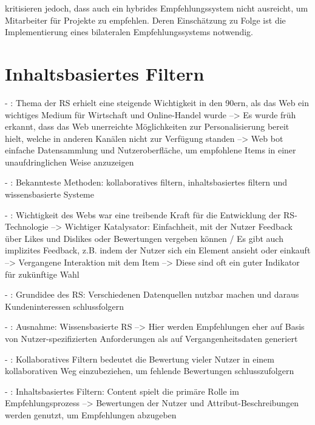 \textcite[S. 1]{malinowski:2008} kritisieren jedoch, dass auch ein hybrides Empfehlungssystem nicht ausreicht, um Mitarbeiter für Projekte zu empfehlen. Deren Einschätzung zu Folge ist die Implementierung eines bilateralen Empfehlungssystems notwendig.

\section{Inhaltsbasiertes Filtern}
\label{ch:empfehlungssysteme:cfundcb}

\newpage
- \cite[S. xvii]{recommenderSystems:2016}: Thema der RS erhielt eine steigende Wichtigkeit in den 90ern, als das Web ein wichtiges Medium für Wirtschaft und Online-Handel wurde --> Es wurde früh erkannt, dass das Web unerreichte Möglichkeiten zur Personalisierung bereit hielt, welche in anderen Kanälen nicht zur Verfügung standen --> Web bot einfache Datensammlung und Nutzeroberfläche, um empfohlene Items in einer unaufdringlichen Weise anzuzeigen

- \cite[S. xvii]{recommenderSystems:2016}: Bekannteste Methoden: kollaboratives filtern, inhaltsbasiertes filtern und wissensbasierte Systeme

- \cite[S. 1]{recommenderSystems:2016}: Wichtigkeit des Webs war eine treibende Kraft für die Entwicklung der RS-Technologie --> Wichtiger Katalysator: Einfachheit, mit der Nutzer Feedback über Likes und Dislikes oder Bewertungen vergeben können / Es gibt auch implizites Feedback, z.B. indem der Nutzer sich ein Element ansieht oder einkauft --> Vergangene Interaktion mit dem Item --> Diese sind oft ein guter Indikator für zukünftige Wahl

- \cite[S. 1]{recommenderSystems:2016}: Grundidee des RS: Verschiedenen Datenquellen nutzbar machen und daraus Kundeninteressen schlussfolgern

- \cite[S. 1f.]{recommenderSystems:2016}: Ausnahme: Wissensbasierte RS --> Hier werden Empfehlungen eher auf Basis von Nutzer-spezifizierten Anforderungen als auf Vergangenheitsdaten generiert

- \cite[S. 2]{recommenderSystems:2016}: Kollaboratives Filtern bedeutet die Bewertung vieler Nutzer in einem kollaborativen Weg einzubeziehen, um fehlende Bewertungen schlusszufolgern

- \cite[S. 2]{recommenderSystems:2016}: Inhaltsbasiertes Filtern: Content spielt die primäre Rolle im Empfehlungsprozess --> Bewertungen der Nutzer und Attribut-Beschreibungen werden genutzt, um Empfehlungen abzugeben

